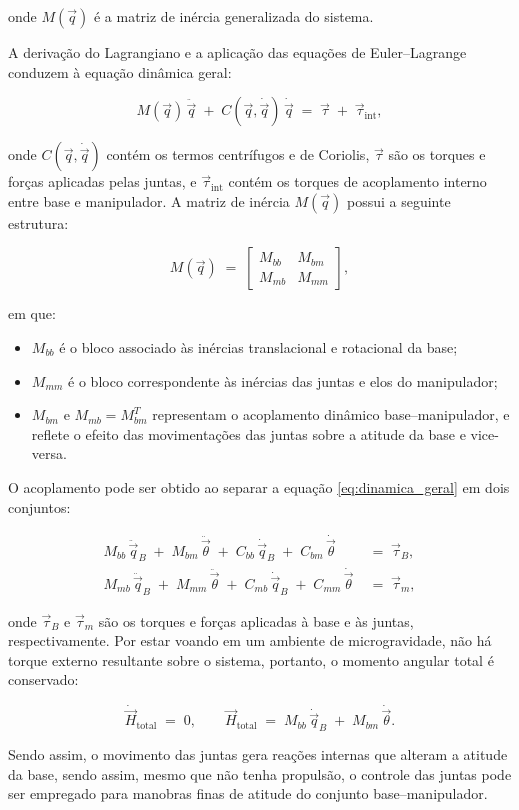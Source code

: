 onde $M(\vec q)$ é a matriz de inércia generalizada do sistema.

A derivação do Lagrangiano e a aplicação das equações de Euler--Lagrange conduzem à equação dinâmica geral:

\begin{equation}
\label{eq:dinamica_geral}
M(\vec q)\,\ddot{\vec q}
\;+\;
C(\vec q, \dot{\vec q})\,\dot{\vec q}
\;=\;
\vec\tau
\;+\;
\vec\tau_{\text{int}},
\end{equation}

onde $C(\vec q, \dot{\vec q})$ contém os termos centrífugos e de Coriolis, $\vec\tau$ são os torques e forças aplicadas pelas juntas, e $\vec\tau_{\text{int}}$ contém os torques de acoplamento interno entre base e manipulador.
A matriz de inércia $M(\vec q)$ possui a seguinte estrutura:

\begin{equation}
\label{eq:M_blocos}
M(\vec q) \;=\;
\begin{bmatrix}
M_{bb} & M_{bm} \\[4pt]
M_{mb} & M_{mm}
\end{bmatrix},
\end{equation}

em que:
\begin{itemize}
    \item $M_{bb}$ é o bloco associado às inércias translacional e rotacional da base;
    \item $M_{mm}$ é o bloco correspondente às inércias das juntas e elos do manipulador;
    \item $M_{bm}$ e $M_{mb}=M_{bm}^T$ representam o acoplamento dinâmico base--manipulador, e reflete o efeito das movimentações das juntas sobre a atitude da base e vice-versa.
\end{itemize}

O acoplamento pode ser obtido ao separar a equação \eqref{eq:dinamica_geral} em dois conjuntos:

\begin{align}
\label{eq:dinamica_blocos}
M_{bb}\,\ddot{\vec q}_B \;+\; M_{bm}\,\ddot{\vec\theta}
\;+\; C_{bb}\,\dot{\vec q}_B \;+\; C_{bm}\,\dot{\vec\theta}
\;&=\; \vec\tau_B, \\[4pt]
M_{mb}\,\ddot{\vec q}_B \;+\; M_{mm}\,\ddot{\vec\theta}
\;+\; C_{mb}\,\dot{\vec q}_B \;+\; C_{mm}\,\dot{\vec\theta}
\;&=\; \vec\tau_m,
\end{align}

onde $\vec\tau_B$ e $\vec\tau_m$ são os torques e forças aplicadas à base e às juntas, respectivamente.
Por estar voando em um ambiente de microgravidade, não há torque externo resultante sobre o sistema, portanto, o momento angular total é conservado:

\begin{equation}
\label{eq:momentum_total}
\dot{\vec H}_{\text{total}} \;=\; 0,
\qquad
\vec H_{\text{total}} \;=\; M_{bb}\,\dot{\vec q}_B \;+\; M_{bm}\,\dot{\vec\theta}.
\end{equation}

Sendo assim, o movimento das juntas gera reações internas que alteram a atitude da base, sendo assim, mesmo que não tenha propulsão, o controle das juntas pode ser empregado para manobras finas de atitude do conjunto base--manipulador.